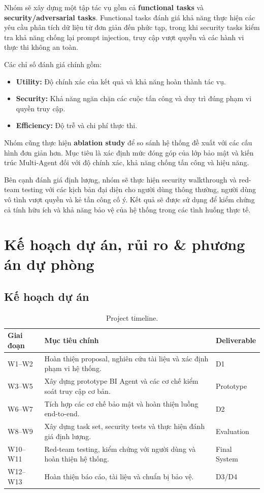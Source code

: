 Nhóm sẽ xây dựng một tập tác vụ gồm cả \textbf{functional tasks} và \textbf{security/adversarial tasks}. Functional tasks đánh giá khả năng thực hiện các yêu cầu phân tích dữ liệu từ đơn giản đến phức tạp, trong khi security tasks kiểm tra khả năng chống lại prompt injection, truy cập vượt quyền và các hành vi thực thi không an toàn.

Các chỉ số đánh giá chính gồm:

\begin{itemize}
\item \textbf{Utility:} Độ chính xác của kết quả và khả năng hoàn thành tác vụ.
\item \textbf{Security:} Khả năng ngăn chặn các cuộc tấn công và duy trì đúng phạm vi quyền truy cập.
\item \textbf{Efficiency:} Độ trễ và chi phí thực thi.
\end{itemize}

Nhóm cũng thực hiện \textbf{ablation study} để so sánh hệ thống đề xuất với các cấu hình đơn giản hơn. Mục tiêu là xác định mức đóng góp của lớp bảo mật và kiến trúc Multi-Agent đối với độ chính xác, khả năng chống tấn công và hiệu năng.

Bên cạnh đánh giá định lượng, nhóm sẽ thực hiện security walkthrough và red-team testing với các kịch bản đại diện cho người dùng thông thường, người dùng vô tình vượt quyền và kẻ tấn công cố ý. Kết quả sẽ được sử dụng để kiểm chứng cả tính hữu ích và khả năng bảo vệ của hệ thống trong các tình huống thực tế.

\section{Kế hoạch dự án, rủi ro \& phương án dự phòng}

\subsection{Kế hoạch dự án}

\begin{table}[h!]
\centering
\small
\begin{tabular}{|p{2.3cm}|p{9.5cm}|p{2.5cm}|}
\hline
\textbf{Giai đoạn} & \textbf{Mục tiêu chính} & \textbf{Deliverable} \\ \hline
W1--W2 & Hoàn thiện proposal, nghiên cứu tài liệu và xác định phạm vi hệ thống. & D1 \\ \hline
W3--W5 & Xây dựng prototype BI Agent và các cơ chế kiểm soát truy cập cơ bản. & Prototype \\ \hline
W6--W7 & Tích hợp các cơ chế bảo mật và hoàn thiện luồng end-to-end. & D2 \\ \hline
W8--W9 & Xây dựng task set, security tests và thực hiện đánh giá định lượng. & Evaluation \\ \hline
W10--W11 & Red-team testing, kiểm chứng với người dùng và hoàn thiện hệ thống. & Final System \\ \hline
W12--W13 & Hoàn thiện báo cáo, tài liệu và chuẩn bị bảo vệ. & D3/D4 \\ \hline
\end{tabular}
\caption{Project timeline.}
\end{table}


